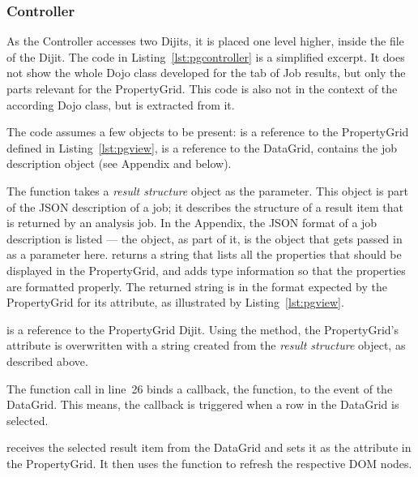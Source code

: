 \subsubsection{Controller}
As the Controller accesses two Dijits, it is placed one level higher, inside the  file of the  Dijit. The code in Listing~\ref{lst:pgcontroller} is a simplified excerpt. It does not show the whole Dojo class developed for the tab of Job results, but only the parts relevant for the PropertyGrid. This code is also not in the context of the according Dojo class, but is extracted from it.

The code assumes a few objects to be present:  is a reference to the PropertyGrid defined in Listing~\ref{lst:pgview},  is a reference to the DataGrid,  contains the job description object (see Appendix and below).

The  function takes a \emph{result structure} object as the parameter. This object is part of the JSON description of a job; it describes the structure of a result item that is returned by an analysis job. In the Appendix, the JSON format of a job description is listed --- the  object, as part of it, is the object that gets passed in as a parameter here.  returns a string that lists all the properties that should be displayed in the PropertyGrid, and adds type information so that the properties are formatted properly. The returned string is in the format expected by the PropertyGrid for its  attribute, as illustrated by Listing~\ref{lst:pgview}.

 is a reference to the PropertyGrid Dijit. Using the  method, the PropertyGrid's  attribute is overwritten with a string created from the \emph{result structure} object, as described above.

The  function call in line~26 binds a callback, the  function, to the  event of the DataGrid. This means, the callback is triggered when a row in the DataGrid is selected.

 receives the selected result item from the DataGrid and sets it as the  attribute in the PropertyGrid. It then uses the  function to refresh the respective DOM nodes.

